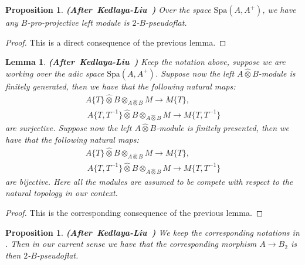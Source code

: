 \documentclass[12pt]{amsart}
\newtheorem{lemma}[theorem]{Lemma}
\newtheorem{proposition}[theorem]{Proposition}
\theoremstyle{definition}
\numberwithin{equation}{section}
\begin{document}
\begin{proposition} \mbox{\bf{(After Kedlaya-Liu \cite[Corollary 2.4.8]{KL2})}}
Over the space $\mathrm{Spa}(A,A^+)$, we have any $B$-pro-projective left module is $2$-$B$-pseudoflat.
\end{proposition}

\begin{proof}
This is a direct consequence of the previous lemma.	
\end{proof}






\begin{lemma} \mbox{\bf{(After Kedlaya-Liu \cite[Corollary 2.4.9]{KL2})}}
Keep the notation above, suppose we are working over the adic space $
\mathrm{Spa}(A,A^+)$. Suppose now the left $A\widehat{\otimes}B$-module is finitely generated, then we have that the following natural maps:
\begin{align}
A\{T\}\widehat{\otimes}B\otimes_{A\widehat{\otimes}B} M	\rightarrow M\{T\},\\\
A\{T,T^{-1}\}\widehat{\otimes}B \otimes_{A\widehat{\otimes}B} M 	\rightarrow M\{T,T^{-1}\}	
\end{align}
are surjective. Suppose now the left $A\widehat{\otimes}B$-module is finitely presented, then we have that the following natural maps:
\begin{align}
A\{T\}\widehat{\otimes}B\otimes_{A\widehat{\otimes}B} M	\rightarrow M\{T\},\\\
A\{T,T^{-1}\}\widehat{\otimes}B \otimes_{A\widehat{\otimes}B} M 	\rightarrow M\{T,T^{-1}\}	
\end{align}
are bijective. Here all the modules are assumed to be compete with respect to the natural topology in our context.


\end{lemma}


\begin{proof}
This is the corresponding consequence of the previous lemma.
\end{proof}






\begin{proposition} \mbox{\bf{(After Kedlaya-Liu \cite[Lemma 2.4.12]{KL2})}}
We keep the corresponding notations in \cite[Lemma 2.4.10]{KL2}. Then in our current sense we have that the corresponding morphism $A\rightarrow B_2$ is then $2$-$B$-pseudoflat. 
\end{proposition}
\end{document}
